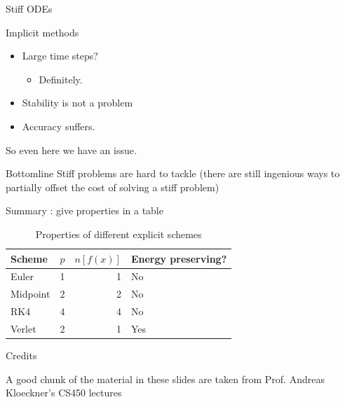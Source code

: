 \documentclass[presentation]{beamer}
\begin{document}
\begin{frame}[label={sec:org6e3737b}]{Stiff ODEs}
\begin{block}{Implicit methods}
\begin{itemize}
\item Large time steps?
\begin{itemize}
\item Definitely.
\end{itemize}
\item \alert{Stability} is not a problem
\item \alert{Accuracy} suffers.
\end{itemize}
\end{block}
\begin{block}{So even here we have an issue.}
\end{block}
\begin{block}{Bottomline}
Stiff problems are hard to tackle (there are still ingenious ways to
partially offset the cost of solving a stiff problem)
\end{block}
\end{frame}

\begin{frame}[label={sec:org839a551}]{Summary : give properties in a table}
\begin{table}[htbp]
\caption{\label{tab_sym_snake_params}
Properties of different explicit schemes}
\centering
\begin{tabular}{lrrl}
\toprule
Scheme & \(p\) & \(n[f(x)]\) & Energy preserving?\\
\midrule
Euler & 1 & 1 & No\\
Midpoint & 2 & 2 & No\\
RK4 & 4 & 4 & No\\
Verlet & 2 & 1 & Yes\\
\bottomrule
\end{tabular}
\end{table}
\end{frame}
\begin{frame}[label={sec:orgfd52e26}]{Credits}
\begin{block}{A good chunk of the material in these slides are taken from Prof. Andreas Kloeckner's CS450 lectures}
\end{block}
\end{frame}
\end{document}
